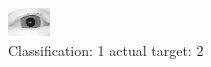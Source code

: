\begin{figure}[h!]
\begin{center}
\includegraphics[width=0.60\columnwidth]{figures/ID3071_class_1_target_2.png}
\end{center}
\caption{ Classification: 1 actual target: 2}
\label{fig:ID3071_class_1_target_2}
\end{figure}

